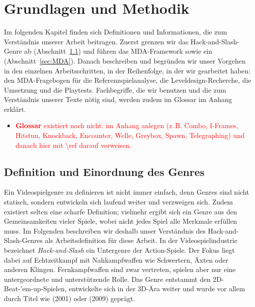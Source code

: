 \documentclass[../Main.tex]{subfiles}
\begin{document}
\section{Grundlagen und Methodik} \label{sec:Grundlagen}
Im folgenden Kapitel finden sich Definitionen und Informationen, die zum Verständnis unserer Arbeit beitragen. Zuerst grenzen wir das Hack-and-Slash-Genre ab (Abschnitt~\ref{sec:Genredefinition}) und führen das MDA-Framework sowie ein (Abschnitt~\ref{sec:MDA}). Danach beschreiben und begründen wir unser Vorgehen in den einzelnen Arbeitsschritten, in der Reihenfolge, in der wir gearbeitet haben: den MDA-Fragebogen für die Referenzspielanalyse, die Leveldesign-Recherche, die Umsetzung und die Playtests. Fachbegriffe, die wir benutzen und die zum Verständnis unserer Texte nötig sind, werden zudem im Glossar im Anhang erklärt.

\begin{itemize}[leftmargin=1.5cm]
    \item \textcolor{red}{\textbf{Glossar} existiert noch nicht: im Anhang anlegen (z.\,B. Combo, I-Frames, Hitstun, Knockback, Encounter, Welle, Greybox, Spawn, Telegraphing) und danach hier mit \textbackslash ref darauf verweisen.}
\end{itemize}

\subsection{Definition und Einordnung des Genres} \label{sec:Genredefinition}
Ein Videospielgenre zu definieren ist nicht immer einfach, denn Genres sind nicht statisch, sondern entwickeln sich laufend weiter und verzweigen sich. Zudem existiert selten eine scharfe Definition; vielmehr ergibt sich ein Genre aus den Gemeinsamkeiten vieler Spiele, wobei nicht jedes Spiel alle Merkmale erfüllen muss. Im Folgenden beschreiben wir deshalb unser Verständnis des Hack-and-Slash-Genres als Arbeitsdefinition für diese Arbeit. In der Videospielindustrie bezeichnet \textit{Hack-and-Slash} ein Untergenre der Action-Spiele. Der Fokus liegt dabei auf Echtzeitkampf mit Nahkampfwaffen wie Schwertern, Äxten oder anderen Klingen. Fernkampfwaffen sind zwar vertreten, spielen aber nur eine untergeordnete und unterstützende Rolle. Das Genre entstammt den 2D-Beat-'em-up-Spielen, entwickelte sich in der 3D-Ära weiter und wurde vor allem durch Titel wie  (2001)\autocite{capcom_devilmaycry_2001} oder  (2009)\autocite{platinumgames_bayonetta_2009} geprägt.\autocite{wikipedia_hackandslash}
\end{document}

